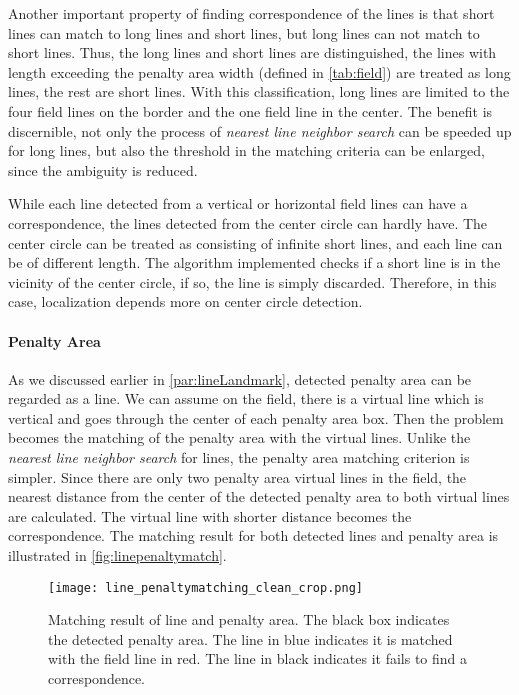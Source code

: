 Another important property of finding correspondence of the lines is that short lines can match to long lines and short lines, but long lines can not match to short lines. Thus, the long lines and short lines are distinguished, the lines with length exceeding the penalty area width (defined in \autoref{tab:field}) are treated as long lines, the rest are short lines. With this classification, long lines are limited to the four field lines on the border and the one field line in the center. The benefit is discernible, not only the process of \textit{nearest line neighbor search} can be speeded up for long lines, but also the threshold in the matching criteria can be enlarged, since the ambiguity is reduced. 

While each line detected from a vertical or horizontal field lines can have a correspondence, the lines detected from the center circle can hardly have. The center circle can be treated as consisting of infinite short lines, and each line can be of different length. The algorithm implemented checks if a short line is in the vicinity of the center circle, if so, the line is simply discarded. Therefore, in this case, localization depends more on center circle detection.




\paragraph{Penalty Area}
As we discussed earlier in \autoref{par:lineLandmark}, detected penalty area can be regarded as a line. We can assume on the field, there is a virtual line which is vertical and goes through the center of each penalty area box. Then the problem becomes the matching of the penalty area with the virtual lines. Unlike the \textit{nearest line neighbor search} for lines, the penalty area matching criterion is simpler. Since there are only two penalty area virtual lines in the field, the nearest distance from the center of the detected penalty area to both virtual lines are calculated. The virtual line with shorter distance becomes the correspondence. The matching result for both detected lines and penalty area is illustrated in \autoref{fig:linepenaltymatch}.

\begin{figure}[h]
\begin{center}
  \texttt{[image: line\_penaltymatching\_clean\_crop.png]}
\end{center}
\caption[Matching result of line and penalty area]{Matching result of line and penalty area. The black box indicates the detected penalty area. The line in blue indicates it is matched with the field line in red. The line in black indicates it fails to find a correspondence.}
\label{fig:linepenaltymatch}
\end{figure}





